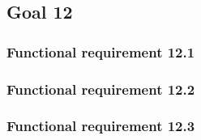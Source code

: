 \subsection{Goal 12}

\setcounter{secnumdepth}{3}
\subsubsection{Functional requirement 12.1}

\subsubsection{Functional requirement 12.2}

\subsubsection{Functional requirement 12.3}
